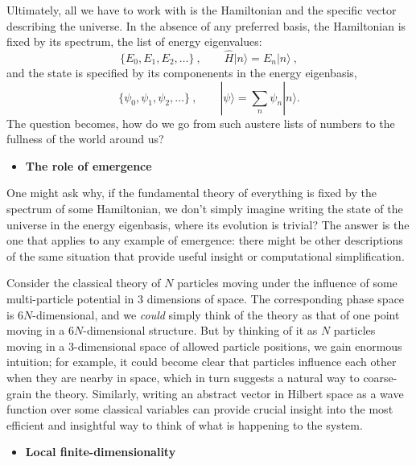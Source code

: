 \documentclass[12pt,english]{article}
\newcommand{\be}{\begin{equation}}
\newcommand{\ee}{\end{equation}}
\begin{document}
Ultimately, all we have to work with is the Hamiltonian and the specific vector describing the universe.
In the absence of any preferred basis, the Hamiltonian is fixed by its spectrum, the list of energy eigenvalues:
\be
  \{E_0, E_1, E_2, \ldots\}\ , \qquad \hat{H}|n\rangle = E_n|n\rangle\ ,
\ee
and the state is specified by its componenents in the energy eigenbasis,
\be
  \{\psi_0, \psi_1, \psi_2, \ldots\}\ ,\qquad |\psi\rangle = \sum_n \psi_n|n\rangle.
\ee
The question becomes, how do we go from such austere lists of numbers to the fullness of the world around us?

\begin{itemize}
\item \textbf{The role of emergence}
\end{itemize}

One might ask why, if the fundamental theory of everything is fixed by the spectrum of some Hamiltonian, we don't simply imagine writing the state of the universe in the energy eigenbasis, where its evolution is trivial?
The answer is the one that applies to any example of emergence: there might be other descriptions of the same situation that provide useful insight or computational simplification.

Consider the classical theory of $N$ particles moving under the influence of some multi-particle potential in $3$ dimensions of space.
The corresponding phase space is $6N$-dimensional, and we \emph{could} simply think of the theory as that of one point moving in a $6N$-dimensional structure.
But by thinking of it as $N$ particles moving in a $3$-dimensional space of allowed particle positions, we gain enormous intuition; for example, it could become clear that particles influence each other when they are nearby in space, which in turn suggests a natural way to coarse-grain the theory.
Similarly, writing an abstract vector in Hilbert space as a wave function over some classical variables can provide crucial insight into the most efficient and insightful way to think of what is happening to the system.


\begin{itemize}
\item \textbf{Local finite-dimensionality}
\end{itemize}
\end{document}
